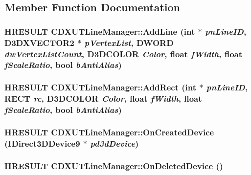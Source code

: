 \subsection{Member Function Documentation}
\hypertarget{class_c_d_x_u_t_line_manager_a943c26c0d740ebcb58e24b1a8f8c70de}{
\subsubsection[{AddLine}]{\setlength{\rightskip}{0pt plus 5cm}HRESULT CDXUTLineManager::AddLine ({\bf int} $\ast$ {\em pnLineID}, \/  D3DXVECTOR2 $\ast$ {\em pVertexList}, \/  DWORD {\em dwVertexListCount}, \/  D3DCOLOR {\em Color}, \/  float {\em fWidth}, \/  float {\em fScaleRatio}, \/  bool {\em bAntiAlias})}}
\label{class_c_d_x_u_t_line_manager_a943c26c0d740ebcb58e24b1a8f8c70de}
\hypertarget{class_c_d_x_u_t_line_manager_ab6a0ff03d7acdabd30ff92c92e696b65}{
\subsubsection[{AddRect}]{\setlength{\rightskip}{0pt plus 5cm}HRESULT CDXUTLineManager::AddRect ({\bf int} $\ast$ {\em pnLineID}, \/  RECT {\em rc}, \/  D3DCOLOR {\em Color}, \/  float {\em fWidth}, \/  float {\em fScaleRatio}, \/  bool {\em bAntiAlias})}}
\label{class_c_d_x_u_t_line_manager_ab6a0ff03d7acdabd30ff92c92e696b65}
\hypertarget{class_c_d_x_u_t_line_manager_ae5dc0839102d2daa1193f3c377af0833}{
\subsubsection[{OnCreatedDevice}]{\setlength{\rightskip}{0pt plus 5cm}HRESULT CDXUTLineManager::OnCreatedDevice (IDirect3DDevice9 $\ast$ {\em pd3dDevice})}}
\label{class_c_d_x_u_t_line_manager_ae5dc0839102d2daa1193f3c377af0833}
\hypertarget{class_c_d_x_u_t_line_manager_a4ad6b10373fe6179783f3805379643c4}{
\subsubsection[{OnDeletedDevice}]{\setlength{\rightskip}{0pt plus 5cm}HRESULT CDXUTLineManager::OnDeletedDevice ()}}
